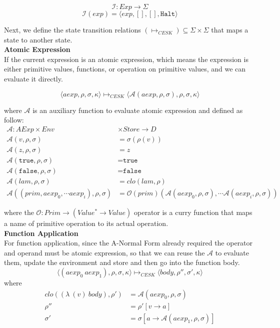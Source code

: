 \documentclass[paper=a4, fontsize=11pt]{scrartcl} %
\numberwithin{equation}{section} %
\numberwithin{figure}{section} %
\numberwithin{table}{section} %
\begin{document}
$$ \mathcal{I} : Exp \rightarrow \Sigma $$
$$ \mathcal{I}(exp) = \langle exp, [], [], \texttt{Halt} \rangle $$

Next, we define the state transition relations $(\longmapsto_{CESK}) \subseteq \Sigma \times \Sigma$ that maps a state to another state. \\

\textbf{Atomic Expression}\\
If the current expression is an atomic expression, which means the expression is either primitive values, functions, or operation on primitive values, and we can evaluate it directly.

$$ \langle aexp, \rho, \sigma, \kappa \rangle \longmapsto_{CESK} \langle \mathcal{A}(aexp, \rho, \sigma), \rho, \sigma, \kappa \rangle $$

where $\mathcal{A}$ is an auxiliary function to evaluate atomic expression and defined as follow:
\begin{align*}
\mathcal{A} : AExp \times Env & \times Store \rightarrow D \\
\mathcal{A}(v, \rho, \sigma) & = \sigma(\rho(v)) \\
\mathcal{A}(z, \rho, \sigma) & = z \\
\mathcal{A}(\texttt{true}, \rho, \sigma) & = \texttt{true} \\
\mathcal{A}(\texttt{false}, \rho, \sigma) & = \texttt{false} \\
\mathcal{A}(lam, \rho, \sigma) & = clo(lam, \rho)  \\
\mathcal{A}((prim, aexp_0, \cdots aexp_i), \rho, \sigma) & = \mathcal{O}(prim)(\mathcal{A}(aexp_0, \rho, \sigma), \cdots \mathcal{A}(aexp_i, \rho, \sigma))
\end{align*}

where the $\mathcal{O} : Prim \rightarrow (Value^* \rightarrow Value)$ operator is a curry function that maps a name of primitive operation to its actual operation.\\

\textbf{Function Application}\\
For function application, since the A-Normal Form already required the operator and operand must be atomic expression, so that we can reuse the $\mathcal{A}$ to evaluate them, update the environment and store and then go into the function body.
$$ \langle (aexp_0~aexp_1), \rho, \sigma, \kappa \rangle \longmapsto_{CESK} \langle body, \rho'', \sigma', \kappa \rangle $$
where 
\begin{align*}
clo((\lambda~(v)~body), \rho') & = \mathcal{A}(aexp_0, \rho, \sigma) \\
\rho'' & = \rho'[v \rightarrow a] \\
\sigma' & = \sigma[a \rightarrow \mathcal{A}(aexp_1, \rho, \sigma)]
\end{align*}
\end{document}
